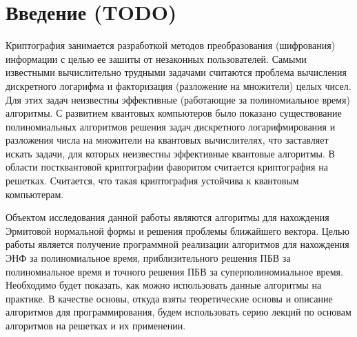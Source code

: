 \newpage

\section{Введение (TODO)}

Криптография занимается разработкой методов преобразования (шифрования) информации с целью ее зашиты от незаконных пользователей. Самыми известными вычислительно трудными задачами считаются проблема вычисления дискретного логарифма и факторизация (разложение на множители) целых чисел. Для этих задач неизвестны эффективные (работающие за полиномиальное время) алгоритмы. С развитием квантовых компьютеров было показано существование полиномиальных алгоритмов решения задач дискретного логарифмирования и разложения числа на множители на квантовых вычислителях, что заставляет искать задачи, для которых неизвестны эффективные квантовые алгоритмы. В области постквантовой криптографии фаворитом считается криптография на решетках. Считается, что такая криптография устойчива к квантовым компьютерам.

Объектом исследования данной работы являются алгоритмы для нахождения Эрмитовой нормальной формы и решения проблемы ближайшего вектора. Целью работы является получение программной реализации алгоритмов для нахождения ЭНФ за полиномиальное время, приблизительного решения ПБВ за полиномиальное время и точного решения ПБВ за суперполиномиальное время. Необходимо будет показать, как можно использовать данные алгоритмы на практике. В качестве основы, откуда взяты теоретические основы и описание алгоритмов для программирования, будем использовать серию лекций по основам алгоритмов на решетках и их применении.


\clearpage

